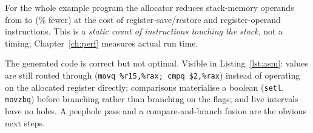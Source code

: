 \begin{figure}[H]
\begin{minipage}[t]{0.52\textwidth}\begingroup{}\endgroup\end{minipage}\hfill
\begin{minipage}[t]{0.44\textwidth}\begingroup{}\endgroup\end{minipage}
\end{figure}

For the whole example program the allocator reduces stack-memory operands from \AsmMemOff{} to \AsmMemOn{} (\AsmMemCut{}\% fewer) at the cost of \AsmRegUses{} register-save/restore and register-operand instructions. This is a \emph{static count of instructions touching the stack}, not a timing; Chapter~\ref{ch:perf} measures actual run time.


\begin{warnbox}
The generated code is correct but not optimal. Visible in Listing~\ref{lst:asm}: values are still routed through  (\verb|movq %r15,%rax; cmpq $2,%rax|) instead of operating on the allocated register directly; comparisons materialise a boolean (\verb|setl|, \verb|movzbq|) before branching rather than branching on the flags; and live intervals have no holes. A peephole pass and a compare-and-branch fusion are the obvious next steps.
\end{warnbox}
